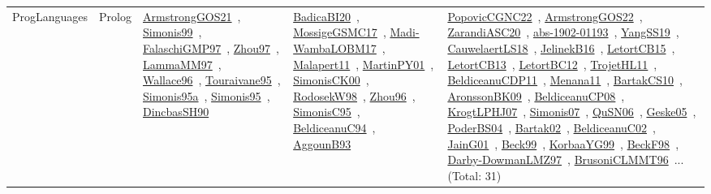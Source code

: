 {\begin{longtable}{lp{3cm}>{\raggedright\arraybackslash}p{6cm}>{\raggedright\arraybackslash}p{6cm}>{\raggedright\arraybackslash}p{8cm}}
ProgLanguages & Prolog & \href{works/ArmstrongGOS21.pdf}{ArmstrongGOS21}~\cite{ArmstrongGOS21}, \href{works/Simonis99.pdf}{Simonis99}~\cite{Simonis99}, \href{works/FalaschiGMP97.pdf}{FalaschiGMP97}~\cite{FalaschiGMP97}, \href{works/Zhou97.pdf}{Zhou97}~\cite{Zhou97}, \href{works/LammaMM97.pdf}{LammaMM97}~\cite{LammaMM97}, \href{works/Wallace96.pdf}{Wallace96}~\cite{Wallace96}, \href{works/Touraivane95.pdf}{Touraivane95}~\cite{Touraivane95}, \href{works/Simonis95a.pdf}{Simonis95a}~\cite{Simonis95a}, \href{works/Simonis95.pdf}{Simonis95}~\cite{Simonis95}, \href{works/DincbasSH90.pdf}{DincbasSH90}~\cite{DincbasSH90} & \href{works/BadicaBI20.pdf}{BadicaBI20}~\cite{BadicaBI20}, \href{works/MossigeGSMC17.pdf}{MossigeGSMC17}~\cite{MossigeGSMC17}, \href{works/Madi-WambaLOBM17.pdf}{Madi-WambaLOBM17}~\cite{Madi-WambaLOBM17}, \href{works/Malapert11.pdf}{Malapert11}~\cite{Malapert11}, \href{works/MartinPY01.pdf}{MartinPY01}~\cite{MartinPY01}, \href{works/SimonisCK00.pdf}{SimonisCK00}~\cite{SimonisCK00}, \href{works/RodosekW98.pdf}{RodosekW98}~\cite{RodosekW98}, \href{works/Zhou96.pdf}{Zhou96}~\cite{Zhou96}, \href{works/SimonisC95.pdf}{SimonisC95}~\cite{SimonisC95}, \href{works/BeldiceanuC94.pdf}{BeldiceanuC94}~\cite{BeldiceanuC94}, \href{works/AggounB93.pdf}{AggounB93}~\cite{AggounB93} & \href{works/PopovicCGNC22.pdf}{PopovicCGNC22}~\cite{PopovicCGNC22}, \href{works/ArmstrongGOS22.pdf}{ArmstrongGOS22}~\cite{ArmstrongGOS22}, \href{works/ZarandiASC20.pdf}{ZarandiASC20}~\cite{ZarandiASC20}, \href{works/abs-1902-01193.pdf}{abs-1902-01193}~\cite{abs-1902-01193}, \href{works/YangSS19.pdf}{YangSS19}~\cite{YangSS19}, \href{works/CauwelaertLS18.pdf}{CauwelaertLS18}~\cite{CauwelaertLS18}, \href{works/JelinekB16.pdf}{JelinekB16}~\cite{JelinekB16}, \href{works/LetortCB15.pdf}{LetortCB15}~\cite{LetortCB15}, \href{works/LetortCB13.pdf}{LetortCB13}~\cite{LetortCB13}, \href{works/LetortBC12.pdf}{LetortBC12}~\cite{LetortBC12}, \href{works/TrojetHL11.pdf}{TrojetHL11}~\cite{TrojetHL11}, \href{works/BeldiceanuCDP11.pdf}{BeldiceanuCDP11}~\cite{BeldiceanuCDP11}, \href{works/Menana11.pdf}{Menana11}~\cite{Menana11}, \href{works/BartakCS10.pdf}{BartakCS10}~\cite{BartakCS10}, \href{works/AronssonBK09.pdf}{AronssonBK09}~\cite{AronssonBK09}, \href{works/BeldiceanuCP08.pdf}{BeldiceanuCP08}~\cite{BeldiceanuCP08}, \href{works/KrogtLPHJ07.pdf}{KrogtLPHJ07}~\cite{KrogtLPHJ07}, \href{works/Simonis07.pdf}{Simonis07}~\cite{Simonis07}, \href{works/QuSN06.pdf}{QuSN06}~\cite{QuSN06}, \href{works/Geske05.pdf}{Geske05}~\cite{Geske05}, \href{works/PoderBS04.pdf}{PoderBS04}~\cite{PoderBS04}, \href{works/Bartak02.pdf}{Bartak02}~\cite{Bartak02}, \href{works/BeldiceanuC02.pdf}{BeldiceanuC02}~\cite{BeldiceanuC02}, \href{works/JainG01.pdf}{JainG01}~\cite{JainG01}, \href{works/Beck99.pdf}{Beck99}~\cite{Beck99}, \href{works/KorbaaYG99.pdf}{KorbaaYG99}~\cite{KorbaaYG99}, \href{works/BeckF98.pdf}{BeckF98}~\cite{BeckF98}, \href{works/Darby-DowmanLMZ97.pdf}{Darby-DowmanLMZ97}~\cite{Darby-DowmanLMZ97}, \href{works/BrusoniCLMMT96.pdf}{BrusoniCLMMT96}~\cite{BrusoniCLMMT96}... (Total: 31)\\

\end{longtable}}
